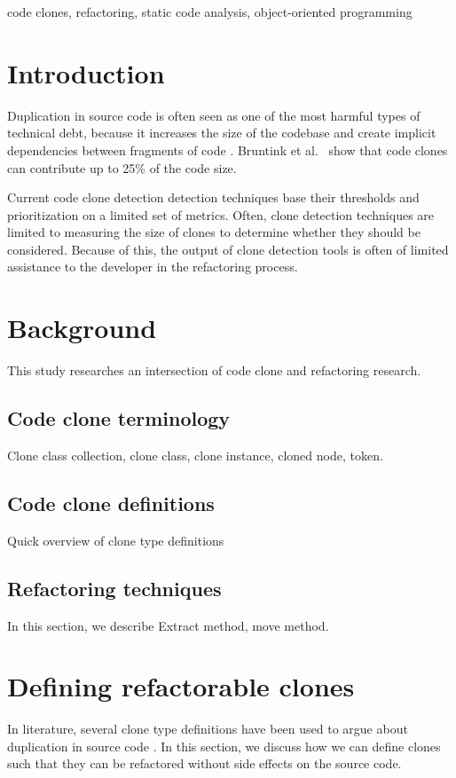 \documentclass[conference]{IEEEtran}
\begin{document}
\begin{IEEEkeywords}
code clones, refactoring, static code analysis, object-oriented programming
\end{IEEEkeywords}

\section{Introduction}
Duplication in source code is often seen as one of the most harmful types of technical debt, because it increases the size of the codebase and create implicit dependencies between fragments of code \cite{ostberg2014automatically}. Bruntink et al.~\cite{bruntink2005use} show that code clones can contribute up to 25\% of the code size.

Current code clone detection detection techniques base their thresholds and prioritization on a limited set of metrics. Often, clone detection techniques are limited to measuring the size of clones to determine whether they should be considered. Because of this, the output of clone detection tools is often of limited assistance to the developer in the refactoring process.



\section{Background}
This study researches an intersection of code clone and refactoring research.

\subsection{Code clone terminology}
Clone class collection, clone class, clone instance, cloned node, token.

\subsection{Code clone definitions}
Quick overview of clone type definitions

\subsection{Refactoring techniques}
In this section, we describe
Extract method, move method.

\section{Defining refactorable clones}
In literature, several clone type definitions have been used to argue about duplication in source code \cite{roy2007survey}. In this section, we discuss how we can define clones such that they can be refactored without side effects on the source code.
\end{document}
